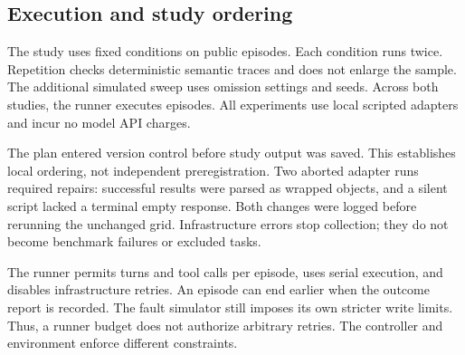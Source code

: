 \documentclass{article}
\begin{document}
\subsection{Execution and study ordering}
The study uses \NConditions{} fixed conditions on \NTasks{} public episodes. Each condition runs twice. Repetition checks deterministic semantic traces and does not enlarge the sample. The additional simulated sweep uses \NLevels{} omission settings and \NSeeds{} seeds. Across both studies, the runner executes \NEpisodes{} episodes. All experiments use local scripted adapters and incur no model API charges.\par
The plan entered version control before study output was saved. This establishes local ordering, not independent preregistration. Two aborted adapter runs required repairs: successful results were parsed as wrapped objects, and a silent script lacked a terminal empty response. Both changes were logged before rerunning the unchanged grid. Infrastructure errors stop collection; they do not become benchmark failures or excluded tasks.\par
The runner permits \NTurns{} turns and \NCalls{} tool calls per episode, uses serial execution, and disables infrastructure retries. An episode can end earlier when the outcome report is recorded. The fault simulator still imposes its own stricter write limits. Thus, a runner budget does not authorize arbitrary retries. The controller and environment enforce different constraints.\par
\end{document}
